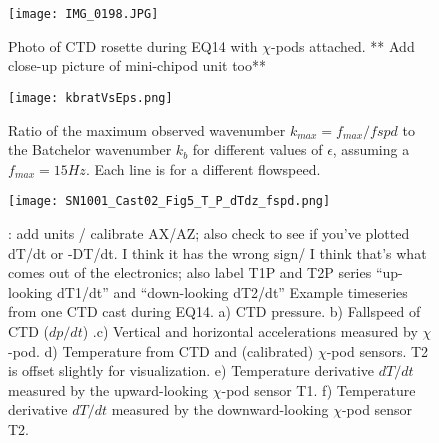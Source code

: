 \documentclass{ametsoc}
\begin{document}
%

\begin{figure}[t]
  \noindent\texttt{[image: IMG\_0198.JPG]}\\
  \caption{Photo of CTD rosette during EQ14 with $\chi$-pods attached. ** Add close-up picture of mini-chipod unit too**}
  \label{f1}
\end{figure}


\begin{figure}[t]
  \noindent\texttt{[image: kbratVsEps.png]}\\
  \caption{Ratio of the maximum observed wavenumber $k_{max}=f_{max}/fspd$ to the Batchelor wavenumber $k_b$ for different values of $\epsilon$, assuming a $f_{max}=15Hz$. Each line is for a different flowspeed.}
  \label{kbratVseps}
\end{figure}



\begin{figure}[t]
  \noindent\texttt{[image: SN1001\_Cast02\_Fig5\_T\_P\_dTdz\_fspd.png]}\\
  \caption{{\emJN: add units / calibrate AX/AZ; also check to see if you've plotted dT/dt or -DT/dt.  I think it has the wrong sign/ I think that's what comes out of the electronics; also label T1P and T2P series ``up-looking dT1/dt'' and ``down-looking dT2/dt''} Example timeseries from one CTD cast during EQ14. a) CTD pressure. b) Fallspeed of CTD ($dp/dt$) .c) Vertical and horizontal accelerations measured by $\chi$-pod. d) Temperature from CTD and (calibrated) $\chi$-pod sensors. T2 is offset slightly for visualization. e) Temperature derivative $dT/dt$ measured by the upward-looking $\chi$-pod sensor T1. f) Temperature derivative $dT/dt$ measured by the downward-looking $\chi$-pod sensor T2. }
  \label{f2}
\end{figure}
\end{document}
